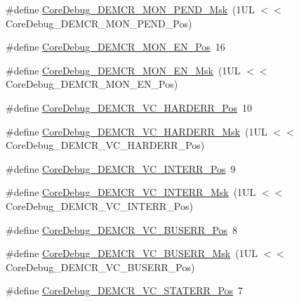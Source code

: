 \begin{DoxyCompactItemize}
\#define \mbox{\hyperlink{group___c_m_s_i_s___core_debug_ga68ec55930269fab78e733dcfa32392f8}{Core\+Debug\+\_\+\+D\+E\+M\+C\+R\+\_\+\+M\+O\+N\+\_\+\+P\+E\+N\+D\+\_\+\+Msk}}~(1\+U\+L $<$$<$ Core\+Debug\+\_\+\+D\+E\+M\+C\+R\+\_\+\+M\+O\+N\+\_\+\+P\+E\+N\+D\+\_\+\+Pos)
\item 
\#define \mbox{\hyperlink{group___c_m_s_i_s___core_debug_ga802829678f6871863ae9ecf60a10425c}{Core\+Debug\+\_\+\+D\+E\+M\+C\+R\+\_\+\+M\+O\+N\+\_\+\+E\+N\+\_\+\+Pos}}~16
\item 
\#define \mbox{\hyperlink{group___c_m_s_i_s___core_debug_gac2b46b9b65bf8d23027f255fc9641977}{Core\+Debug\+\_\+\+D\+E\+M\+C\+R\+\_\+\+M\+O\+N\+\_\+\+E\+N\+\_\+\+Msk}}~(1\+U\+L $<$$<$ Core\+Debug\+\_\+\+D\+E\+M\+C\+R\+\_\+\+M\+O\+N\+\_\+\+E\+N\+\_\+\+Pos)
\item 
\#define \mbox{\hyperlink{group___c_m_s_i_s___core_debug_gaed9f42053031a9a30cd8054623304c0a}{Core\+Debug\+\_\+\+D\+E\+M\+C\+R\+\_\+\+V\+C\+\_\+\+H\+A\+R\+D\+E\+R\+R\+\_\+\+Pos}}~10
\item 
\#define \mbox{\hyperlink{group___c_m_s_i_s___core_debug_ga803fc98c5bb85f10f0347b23794847d1}{Core\+Debug\+\_\+\+D\+E\+M\+C\+R\+\_\+\+V\+C\+\_\+\+H\+A\+R\+D\+E\+R\+R\+\_\+\+Msk}}~(1\+U\+L $<$$<$ Core\+Debug\+\_\+\+D\+E\+M\+C\+R\+\_\+\+V\+C\+\_\+\+H\+A\+R\+D\+E\+R\+R\+\_\+\+Pos)
\item 
\#define \mbox{\hyperlink{group___c_m_s_i_s___core_debug_ga22079a6e436f23b90308be97e19cf07e}{Core\+Debug\+\_\+\+D\+E\+M\+C\+R\+\_\+\+V\+C\+\_\+\+I\+N\+T\+E\+R\+R\+\_\+\+Pos}}~9
\item 
\#define \mbox{\hyperlink{group___c_m_s_i_s___core_debug_gad6815d8e3df302d2f0ff2c2c734ed29a}{Core\+Debug\+\_\+\+D\+E\+M\+C\+R\+\_\+\+V\+C\+\_\+\+I\+N\+T\+E\+R\+R\+\_\+\+Msk}}~(1\+U\+L $<$$<$ Core\+Debug\+\_\+\+D\+E\+M\+C\+R\+\_\+\+V\+C\+\_\+\+I\+N\+T\+E\+R\+R\+\_\+\+Pos)
\item 
\#define \mbox{\hyperlink{group___c_m_s_i_s___core_debug_gab8e3d8f0f9590a51bbf10f6da3ad6933}{Core\+Debug\+\_\+\+D\+E\+M\+C\+R\+\_\+\+V\+C\+\_\+\+B\+U\+S\+E\+R\+R\+\_\+\+Pos}}~8
\item 
\#define \mbox{\hyperlink{group___c_m_s_i_s___core_debug_ga9d29546aefe3ca8662a7fe48dd4a5b2b}{Core\+Debug\+\_\+\+D\+E\+M\+C\+R\+\_\+\+V\+C\+\_\+\+B\+U\+S\+E\+R\+R\+\_\+\+Msk}}~(1\+U\+L $<$$<$ Core\+Debug\+\_\+\+D\+E\+M\+C\+R\+\_\+\+V\+C\+\_\+\+B\+U\+S\+E\+R\+R\+\_\+\+Pos)
\item 
\#define \mbox{\hyperlink{group___c_m_s_i_s___core_debug_ga16f0d3d2ce1e1e8cd762d938ac56c4ac}{Core\+Debug\+\_\+\+D\+E\+M\+C\+R\+\_\+\+V\+C\+\_\+\+S\+T\+A\+T\+E\+R\+R\+\_\+\+Pos}}~7
$$
\end{DoxyCompactItemize}
